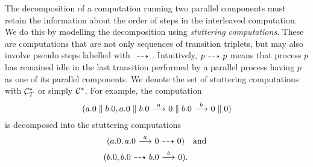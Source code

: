 The decomposition of a computation running two parallel components must retain the
information about the order of steps in the interleaved computation. We do this
by modelling the decomposition using {\em stuttering computations}. These are
computations that are not only sequences of transition triplets, but may also involve
pseudo steps labelled with $\ {\stackrel{_{}}{\dashrightarrow}}\ $. Intuitively, $p\ {\stackrel{_{}}{\dashrightarrow}}\  p$ means that
process $p$ has remained idle in the last transition performed by a parallel process
having $p$ as one of its parallel components.
We denote
the set of stuttering computations with $\mathcal{C}_{\mathcal{T}}^*$ or simply $\mathcal{C}^*$.
For example, the computation
\[
(a.0\parallel b.0,
a.0\parallel b.0 \ {\stackrel{{a}}{\longrightarrow}}\ 
0\parallel b.0 \ {\stackrel{{b}}{\longrightarrow}}\ 
0\parallel 0)
\]
is decomposed into the stuttering computations
\begin{gather*}
    (a.0,a.0 \trans{a}0 \ptrans{}0) \quad\textrm{and}\\
    (b.0,b.0 \ptrans{} b.0 \trans{b} 0).\quad\phantom{\textrm{and}}
\end{gather*}
%
